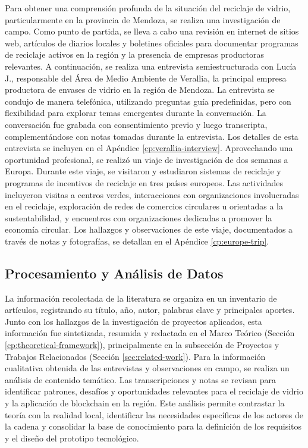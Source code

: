 Para obtener una comprensión profunda de la situación del reciclaje de vidrio, particularmente en la provincia de Mendoza, se realiza una investigación de campo.
Como punto de partida, se lleva a cabo una revisión en internet de sitios web, artículos de diarios locales y boletines oficiales para documentar programas de reciclaje activos en la región y la presencia de empresas productoras relevantes.
A continuación, se realiza una entrevista semiestructurada con Lucía J., responsable del Área de Medio Ambiente de Verallia, la principal empresa productora de envases de vidrio en la región de Mendoza.
La entrevista se condujo de manera telefónica, utilizando preguntas guía predefinidas, pero con flexibilidad para explorar temas emergentes durante la conversación.
La conversación fue grabada con consentimiento previo y luego transcripta, complementándose con notas tomadas durante la entrevista.
Los detalles de esta entrevista se incluyen en el Apéndice \ref{cp:verallia-interview}.
Aprovechando una oportunidad profesional, se realizó un viaje de investigación de dos semanas a Europa.
Durante este viaje, se visitaron y estudiaron sistemas de reciclaje y programas de incentivos de reciclaje en tres países europeos.
Las actividades incluyeron visitas a centros verdes, interacciones con organizaciones involucradas en el reciclaje, exploración de redes de comercios circulares u orientadas a la sustentabilidad, y encuentros con organizaciones dedicadas a promover la economía circular.
Los hallazgos y observaciones de este viaje, documentados a través de notas y fotografías, se detallan en el Apéndice \ref{cp:europe-trip}.

\subsection{Procesamiento y Análisis de Datos}
La información recolectada de la literatura se organiza en un inventario de artículos, registrando su título, año, autor, palabras clave y principales aportes.
Junto con los hallazgos de la investigación de proyectos aplicados, esta información fue sintetizada, resumida y redactada en el Marco Teórico (Sección \ref{cp:theoretical-framework}), principalmente en la subsección de Proyectos y Trabajos Relacionados (Sección \ref{sec:related-work}).
Para la información cualitativa obtenida de las entrevistas y observaciones en campo, se realiza un análisis de contenido temático.
Las transcripciones y notas se revisan para identificar patrones, desafíos y oportunidades relevantes para el reciclaje de vidrio y la aplicación de blockchain en la región.
Este análisis permite contrastar la teoría con la realidad local, identificar las necesidades específicas de los actores de la cadena y consolidar la base de conocimiento para la definición de los requisitos y el diseño del prototipo tecnológico.

